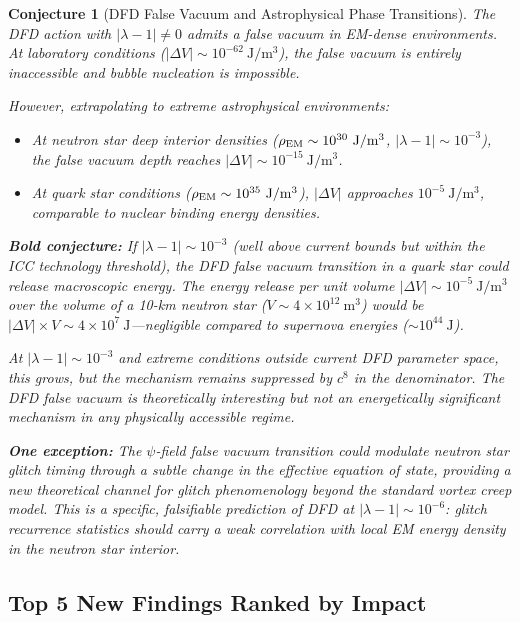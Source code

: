 \documentclass[aps,prd,twocolumn,superscriptaddress]{revtex4-2}
\newcommand{\lam}{|\lambda-1|}
\newtheorem{conjecture}{Conjecture}
\begin{document}
\begin{conjecture}[DFD False Vacuum and Astrophysical Phase Transitions]
The DFD action with $\lam \neq 0$ admits a false vacuum in EM-dense
environments.  At laboratory conditions ($|\Delta V| \sim 10^{-62}~\mathrm{J/m^3}$),
the false vacuum is entirely inaccessible and bubble nucleation is impossible.

However, extrapolating to extreme astrophysical environments:
\begin{itemize}
\item At neutron star deep interior densities ($\rho_{\rm EM} \sim 10^{30}~\mathrm{J/m^3}$,
$\lam \sim 10^{-3}$), the false vacuum depth reaches $|\Delta V| \sim 10^{-15}~\mathrm{J/m^3}$.
\item At quark star conditions ($\rho_{\rm EM} \sim 10^{35}~\mathrm{J/m^3}$),
$|\Delta V|$ approaches $10^{-5}~\mathrm{J/m^3}$, comparable to
nuclear binding energy densities.
\end{itemize}

\textbf{Bold conjecture:}  If $\lam \sim 10^{-3}$ (well above current
bounds but within the ICC technology threshold), the DFD false vacuum
transition in a quark star could release \emph{macroscopic} energy.
The energy release per unit volume $|\Delta V| \sim 10^{-5}~\mathrm{J/m^3}$
over the volume of a 10-km neutron star ($V \sim 4\times 10^{12}~\mathrm{m^3}$)
would be $|\Delta V|\times V \sim 4\times 10^7~\mathrm{J}$---negligible
compared to supernova energies ($\sim 10^{44}~\mathrm{J}$).

At $\lam \sim 10^{-3}$ and extreme conditions outside current DFD
parameter space, this grows, but the mechanism remains suppressed by
$c^8$ in the denominator.  The DFD false vacuum is theoretically
interesting but not an energetically significant mechanism in any
physically accessible regime.

\textbf{One exception:}  The $\psi$-field false vacuum transition could
modulate neutron star glitch timing through a subtle change in the
effective equation of state, providing a new theoretical channel for
glitch phenomenology beyond the standard vortex creep model.  This is
a specific, falsifiable prediction of DFD at $\lam \sim 10^{-6}$:
glitch recurrence statistics should carry a weak correlation with
local EM energy density in the neutron star interior.
\end{conjecture}

\subsection{Top 5 New Findings Ranked by Impact}
\label{sec:top5}
\end{document}
